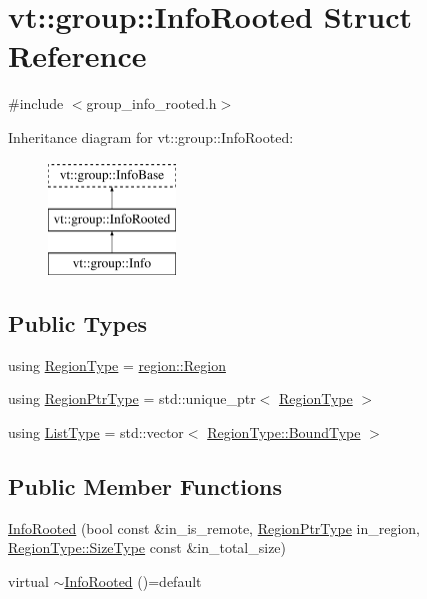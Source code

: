 \hypertarget{structvt_1_1group_1_1_info_rooted}{}\section{vt\+:\+:group\+:\+:Info\+Rooted Struct Reference}
\label{structvt_1_1group_1_1_info_rooted}


{\ttfamily \#include $<$group\+\_\+info\+\_\+rooted.\+h$>$}

Inheritance diagram for vt\+:\+:group\+:\+:Info\+Rooted\+:\begin{figure}[H]
\begin{center}
\leavevmode
\includegraphics[height=3.000000cm]{structvt_1_1group_1_1_info_rooted}
\end{center}
\end{figure}
\subsection*{Public Types}
\begin{DoxyCompactItemize}
\item 
using \hyperlink{structvt_1_1group_1_1_info_rooted_a9d665331fedfc780eeb0efe16372e104}{Region\+Type} = \hyperlink{structvt_1_1group_1_1region_1_1_region}{region\+::\+Region}
\item 
using \hyperlink{structvt_1_1group_1_1_info_rooted_a127ac5ebcfb9871621c1f66dba481c0b}{Region\+Ptr\+Type} = std\+::unique\+\_\+ptr$<$ \hyperlink{structvt_1_1group_1_1_info_rooted_a9d665331fedfc780eeb0efe16372e104}{Region\+Type} $>$
\item 
using \hyperlink{structvt_1_1group_1_1_info_rooted_aab859fcabc7b137db51af4af86ebe56d}{List\+Type} = std\+::vector$<$ \hyperlink{structvt_1_1group_1_1region_1_1_region_abf426ff85bed72c1c6524fad6a9f1751}{Region\+Type\+::\+Bound\+Type} $>$
\end{DoxyCompactItemize}
\subsection*{Public Member Functions}
\begin{DoxyCompactItemize}
\item 
\hyperlink{structvt_1_1group_1_1_info_rooted_a2eae545681022b5595355823efdf6e0d}{Info\+Rooted} (bool const \&in\+\_\+is\+\_\+remote, \hyperlink{structvt_1_1group_1_1_info_rooted_a127ac5ebcfb9871621c1f66dba481c0b}{Region\+Ptr\+Type} in\+\_\+region, \hyperlink{structvt_1_1group_1_1region_1_1_region_a9bb381adf31111aae34dbc644bad6c1f}{Region\+Type\+::\+Size\+Type} const \&in\+\_\+total\+\_\+size)
\item 
virtual \hyperlink{structvt_1_1group_1_1_info_rooted_a05bb560edad783357c29feab64f42f60}{$\sim$\+Info\+Rooted} ()=default
\end{DoxyCompactItemize}
